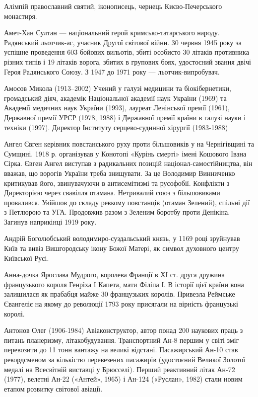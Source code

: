 Алімпій православний святий, іконописець, чернець Києво-Печерського монастиря.

Амет-Хан Султан — національний герой кримсько-татарського народу. Радянський льотчик-ас, учасник Другої світової війни. 30 червня 1945 року за успішне проведення 603 бойових вильотів, збиті особисто 30 літаків противника різних типів і 19 літаків ворога, збитих в групових боях, удостоєний звання двічі Героя Радянського Союзу. З 1947 до 1971 року — льотчик-випробувач.

Амосов Микола (1913–2002) Учений у галузі медицини та біокібернетики, громадський діяч, академік Національної академії наук України (1969) та Академії медичних наук України (1993), лауреат Ленінської премії (1961), Державної премії УРСР (1978, 1988) і Державної премії країни в галузі науки і техніки (1997). Директор Інституту серцево-судинної хірургії (1983-1988)

Ангел Євген керівник повстанського руху проти більшовиків у  на Чернігівщині та Сумщині. 1918 р. організував у Конотопі «Курінь смерті» імені Кошового Івана Сірка. Євген Ангел виступав з радикальних позицій націонал-самостійництва, він вважав, що ворогів України треба знищувати. За це Володимир Винниченко критикував його, звинувачуючи в антисемітизмі та русофобії.  Конфлікти з Директорією через свавілля отамана. Нетривалий союз з більшовиками провалився. Увійшов до складу ревкому повстанців (отаман Зелений), спільні дії з Петлюрою та УГА. Продовжив разом з Зеленим боротбу проти Денікіна. Загинув наприкінці 1919 року. 

Андрій Боголюбський володимиро-суздальський князь, у 1169 році зруйнував Київ та вивіз Вишгородську ікону Божої Матері, як символ духовного центру Київської Русі.

Анна-дочка Ярослава Мудрого, королева Франції в ХІ ст. друга дружина французького короля Генріха I Капета, мати Філіпа І. В історії цієї країни вона залишилася як прабабця майже 30 французьких королів. Привезла Реймське Євангеліє на якому до революції 1793 року присягали на вірність французькі королі.

Антонов Олег (1906-1984) Авіаконструктор, автор понад 200 наукових праць з питань планеризму, літакобудування. Транспортний Ан-8 першим у світі зміг перевозити до 11 тонн вантажу на великі відстані. Пасажирський Ан-10 став рекордсменом за кількістю перевезених пасажирів (удостоєний Великої Золотої медалі на Всесвітній виставці у Брюсселі). Перший реактивний літак Ан-72 (1977), велетні Ан-22 («Антей», 1965) і Ан-124 («Руслан», 1982) стали новим етапом розвитку світової авіації.

